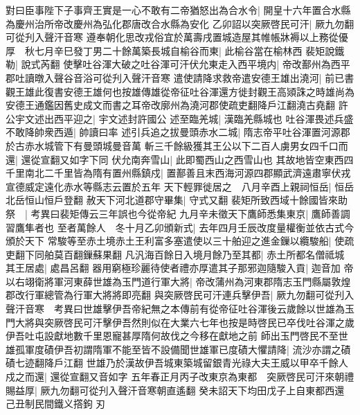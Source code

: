 對曰臣事陛下子事齊王實是一心不敢有二帝猶怒出為合水令|{
	開皇十六年置合水縣為慶州治所帝改慶州為弘化郡唐改合水縣為安化}
乙卯詔以突厥啓民可汗|{
	厥九勿翻可從刋入聲汗音寒}
遵奉朝化思改戎俗宜於萬壽戌置城造屋其帷帳牀褥以上務從優厚　秋七月辛巳發丁男二十餘萬築長城自榆谷而東|{
	此榆谷當在榆林西}
裴矩說鐵勒|{
	說式芮翻}
使擊吐谷渾大破之吐谷渾可汗伏允東走入西平境内|{
	帝改鄯州為西平郡吐讀暾入聲谷音浴可從刋入聲汗音寒}
遣使請降求救帝遣安德王雄出澆河|{
	前已書觀王雄此復書安德王雄何也按雄傳雄從帝征吐谷渾還方徙封觀王高熲誅之時雄尚為安德王通鑑因舊史成文而書之耳帝改廓州為澆河郡使疏吏翻降戶江翻澆古堯翻}
許公宇文述出西平迎之|{
	宇文述封許國公}
述至臨羌城|{
	漢臨羌縣城也}
吐谷渾畏述兵盛不敢降帥衆西遁|{
	帥讀曰率}
述引兵追之拔曼頭赤水二城|{
	隋志帝平吐谷渾置河源郡於古赤水城管下有曼頭城曼音萬}
斬三千餘級獲其王公以下二百人虜男女四千口而還|{
	還從宣翻又如字下同}
伏允南奔雪山|{
	此即蜀西山之西雪山也}
其故地皆空東西四千里南北二千里皆為隋有置州縣鎮戍|{
	置鄯善且末西海河源四郡顯武濟遠肅寧伏戎宣德威定遠化赤水等縣志云置於五年}
天下輕罪徙居之　八月辛酉上親祠恒岳|{
	恒岳北岳恒山恒戶登翻}
赦天下河北道郡守畢集|{
	守式又翻}
裴矩所致西域十餘國皆來助祭　|{
	考異曰裴矩傳云三年誤也今從帝紀}
九月辛未徵天下鷹師悉集東京|{
	鷹師善調習鷹隼者也}
至者萬餘人　冬十月乙卯頒新式|{
	去年四月壬辰改度量權衡並依古式今頒於天下}
常駿等至赤土境赤土王利富多塞遣使以三十舶迎之進金鏁以纜駿船|{
	使疏吏翻下同舶莫百翻鏁蘇果翻}
凡汎海百餘日入境月餘乃至其都|{
	赤土所都名僧祗城}
其王居處|{
	處昌呂翻}
器用窮極珍麗待使者禮亦厚遣其子那邪迦隨駿入貢|{
	迦音加}
帝以右翊衛將軍河東薛世雄為玉門道行軍大將|{
	帝改蒲州為河東郡隋志玉門縣屬敦煌郡改行軍總管為行軍大將將即亮翻}
與突厥啓民可汗連兵擊伊吾|{
	厥九勿翻可從刋入聲汗音寒　考異曰世雄擊伊吾帝紀無之本傳前有從帝征吐谷渾後云歲餘以世雄為玉門大將與突厥啓民可汗擊伊吾然則似在大業六七年也按是時啓民已卒伐吐谷渾之歲伊吾吐屯設獻地數千里恩寵甚厚隋何故伐之今移在獻地之前}
師出玉門啓民不至世雄孤軍度磧伊吾初謂隋軍不能至皆不設備聞世雄軍已度磧大懼請降|{
	流沙亦謂之磧磧七迹翻降戶江翻}
世雄乃於漢故伊吾城東築城留銀青光祿大夫王威以甲卒千餘人戍之而還|{
	還從宣翻又音如字}
五年春正月丙子改東京為東都　突厥啓民可汗來朝禮賜益厚|{
	厥九勿翻可從刋入聲汗音寒朝直遙翻}
癸未詔天下均田戊子上自東都西還　己丑制民間鐵义撘鉤刃

